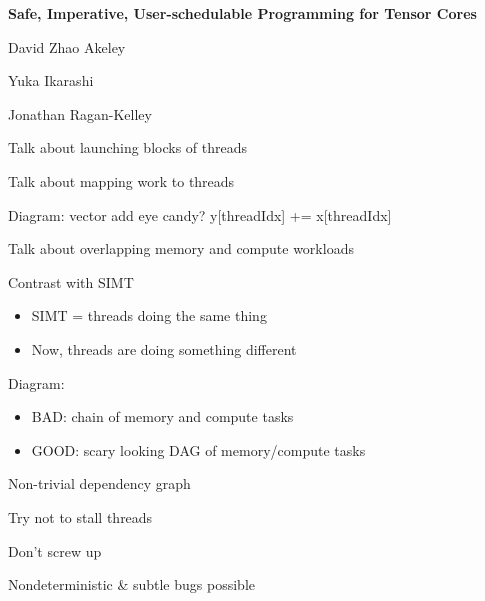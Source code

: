 
\textbf{\hfill \large Safe, Imperative, User-schedulable Programming for Tensor Cores}

{\LARGE

\vfill

David Zhao Akeley

Yuka Ikarashi

Jonathan Ragan-Kelley

\hfill {}}


\newpage
{}

{\LARGE

Talk about launching blocks of threads

Talk about mapping work to threads

Diagram: vector add eye candy? y[threadIdx] += x[threadIdx]

}

\newpage
{}

{\LARGE

Talk about overlapping memory and compute workloads

Contrast with SIMT
\begin{itemize}
  \item SIMT = threads doing the same thing
  \item Now, threads are doing something different
\end{itemize}

Diagram:
\begin{itemize}
  \item BAD: chain of memory and compute tasks
  \item GOOD: scary looking DAG of memory/compute tasks
\end{itemize}

Non-trivial dependency graph

}

\newpage
{}

{\LARGE

Try not to stall threads

Don't screw up

Nondeterministic \& subtle bugs possible

}


\newpage
{}

